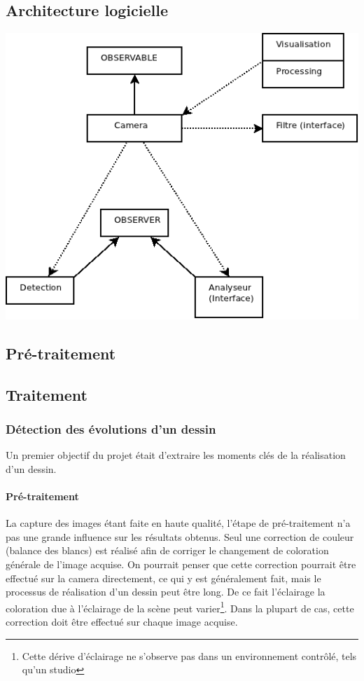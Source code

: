 \subsection{Architecture logicielle}

\begin{center}
\includegraphics[scale=0.66]{Archi/Architecture.png}
\end{center}

\subsection{Pré-traitement} %


\subsection{Traitement}
\subsubsection{Détection des évolutions d'un dessin}
Un premier objectif du projet était d'extraire les moments clés de la réalisation d'un dessin.

\paragraph{Pré-traitement\\}
La capture des images étant faite en haute qualité, l'étape de pré-traitement n'a pas une grande influence sur les résultats obtenus. Seul une correction de couleur (balance des blancs) est réalisé afin de corriger le changement de coloration générale de l'image acquise. On pourrait penser que cette correction pourrait être effectué sur la camera directement, ce qui y est généralement fait, mais le processus de réalisation d'un dessin peut être long. De ce fait l'éclairage la coloration due à l'éclairage de la scène peut varier\footnote{Cette dérive d'éclairage ne s'observe pas dans un environnement contrôlé, tels qu'un studio}. Dans la plupart de cas, cette correction doit être effectué sur chaque image acquise.

